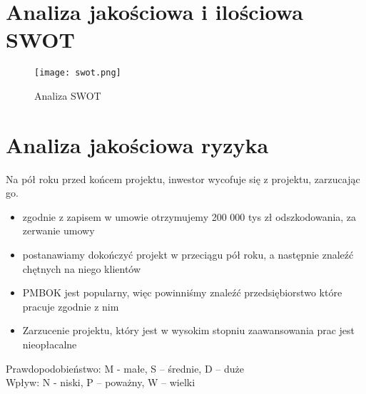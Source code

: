 \clearpage


\section{Analiza jakościowa i ilościowa SWOT}

\begin{figure}[!h]
\begin{center}
\texttt{[image: swot.png]}
\caption[Analiza SWOT]{Analiza SWOT}
\label{rysunekProces}
\end{center}
\end{figure}

\clearpage


\section{Analiza jakościowa ryzyka}

Na pół roku przed końcem projektu, inwestor wycofuje się z projektu, zarzucając go.
\begin{itemize}
\item zgodnie z zapisem w umowie otrzymujemy 200 000 tys zł odszkodowania, za zerwanie umowy
\item postanawiamy dokończyć projekt w przeciągu pół roku, a następnie znaleźć chętnych na niego klientów
\item PMBOK jest popularny, więc powinniśmy znaleźć przedsiębiorstwo które pracuje zgodnie z nim
\item Zarzucenie projektu, który jest w wysokim stopniu zaawansowania prac jest nieopłacalne
\end{itemize}


Prawdopodobieństwo:  M - małe, S – średnie, D – duże\\
Wpływ: N - niski, P – poważny, W – wielki

